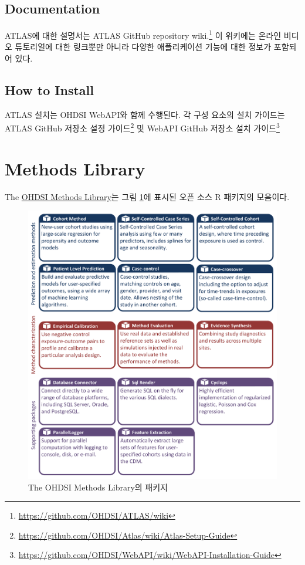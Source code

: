 \documentclass[11pt]{book}
\let\rmarkdownfootnote\footnote%
\def\footnote{\protect\rmarkdownfootnote}
\theoremstyle{definition}
\theoremstyle{definition}
\theoremstyle{definition}
\theoremstyle{remark}
\begin{document}
\subsection{Documentation}\label{documentation}

ATLAS에 대한 설명서는 ATLAS GitHub repository wiki.\footnote{\url{https://github.com/OHDSI/ATLAS/wiki}}
이 위키에는 온라인 비디오 튜토리얼에 대한 링크뿐만 아니라 다양한
애플리케이션 기능에 대한 정보가 포함되어 있다.

\subsection{How to Install}\label{how-to-install}

ATLAS 설치는 OHDSI WebAPI와 함께 수행된다. 각 구성 요소의 설치 가이드는
ATLAS GitHub 저장소 설정 가이드\footnote{\url{https://github.com/OHDSI/Atlas/wiki/Atlas-Setup-Guide}}
및 WebAPI GitHub 저장소 설치 가이드\footnote{\url{https://github.com/OHDSI/WebAPI/wiki/WebAPI-Installation-Guide}}

\section{Methods Library}\label{methods-library}

The \href{https://ohdsi.github.io/MethodsLibrary/}{OHDSI Methods
Library}는 그림 \ref{fig:methodsLibrary}에 표시된 오픈 소스 R 패키지의
모음이다. 

\begin{figure}

{\centering \includegraphics[width=1\linewidth]{images/OhdsiAnalyticsTools/methodsLibrary} 

}

\caption{The OHDSI Methods Library의 패키지}\label{fig:methodsLibrary}
\end{figure}
\end{document}
